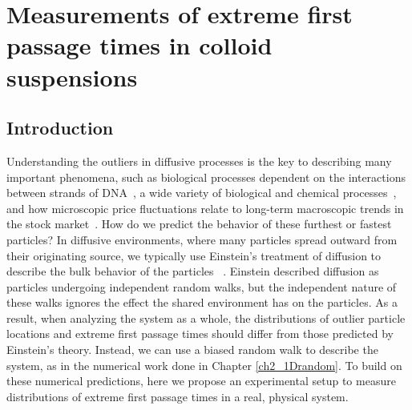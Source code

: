 \chapter{Measurements of extreme first passage times in colloid suspensions}
\label{ch3_extras}

\section{Introduction}
Understanding the outliers in diffusive processes is the key to describing many important phenomena, such as biological processes dependent on the interactions between strands of DNA~\cite{zhang_first-passage_2016}, a wide variety of biological and chemical processes~\cite{grebenkov_escape_2017,grebenkov_molecular_2021,polizzi_mean_2016,redner_guide_2001,nicholson_extracellular_1998}, and how microscopic price fluctuations relate to long-term macroscopic trends in the stock market~\cite{barney_first-passage-time_2017,liu_anchoring_2017}. How do we predict the behavior of these furthest or fastest particles? In diffusive environments, where many particles spread outward from their originating source, we typically use Einstein’s treatment of diffusion to describe the bulk behavior of the particles~ \cite{einstein_uber_1905, von_smoluchowski_zur_1906, sutherland_lxxv_1905}. Einstein described diffusion as particles undergoing independent random walks, but the independent nature of these walks ignores the effect the shared environment has on the particles. As a result, when analyzing the system as a whole, the distributions of outlier particle locations and extreme first passage times should differ from those predicted by Einstein’s theory. Instead, we can use a biased random walk to describe the system, as in the numerical work done in Chapter \ref{ch2_1Drandom}. To build on these numerical predictions, here we propose an experimental setup to measure distributions of extreme first passage times in a real, physical system.
 
